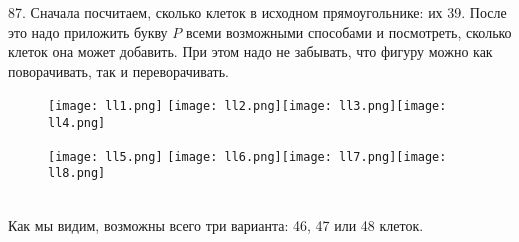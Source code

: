 87. Сначала посчитаем, сколько клеток в исходном прямоугольнике: их 39. После это надо приложить букву $P$ всеми возможными способами и посмотреть, сколько клеток она может добавить. При этом надо не забывать, что фигуру можно как поворачивать, так и переворачивать.
\begin{figure}[ht!]
\texttt{[image: ll1.png]} \texttt{[image: ll2.png]}\texttt{[image: ll3.png]}\texttt{[image: ll4.png]}\end{figure}
\begin{figure}[ht!]\texttt{[image: ll5.png]} \texttt{[image: ll6.png]}\texttt{[image: ll7.png]}\texttt{[image: ll8.png]}
\end{figure}\\
Как мы видим, возможны всего три варианта: 46, 47 или 48 клеток.\\
